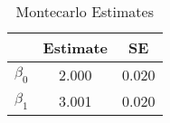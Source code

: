 \begin{table}[htb]
\centering
\caption{Montecarlo Estimates}
\label{table:ea3:ps1:q3a:tab2}
\begin{tabular}{lcc}
\hline
 & Estimate & SE \\
\hline\hline
$\beta_0$ & 2.000 & 0.020 \\
$\beta_1$ & 3.001 & 0.020 \\
\hline
\end{tabular}
\end{table}
